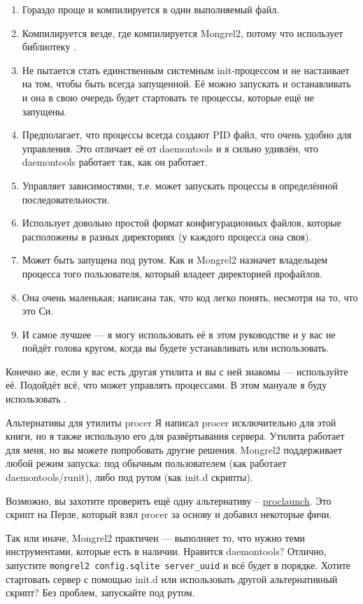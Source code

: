 \begin{enumerate}
\item Гораздо проще и компилируется в один выполняемый файл.
\item Компилируется везде, где компилируется Mongrel2, потому что использует
    библиотеку .
\item Не пытается стать единственным системным init-процессом и не настаивает на
    том, чтобы быть всегда запущенной. Её можно запускать и останавливать и она в
    свою очередь будет стартовать те процессы, которые ещё не запущены.
\item Предполагает, что процессы всегда создают PID файл, что очень удобно
    для управления. Это отличает её от daemontools и я сильно удивлён, что
    daemontools работает так, как он работает.
\item Управляет зависимостями, т.е. может запускать процессы в определённой
    последовательности.
\item Использует довольно простой формат конфигурационных файлов, которые
    расположены в разных директориях (у каждого процесса она своя).
\item Может быть запущена под рутом. Как и Mongrel2 назначет владельцем процесса
    того пользователя, который владеет директорией профайлов.
\item Она очень маленькая; написана так, что код легко понять, несмотря на то,
    что это Си.
\item И самое лучшее --- я могу использовать её в этом руководстве и у вас не
    пойдёт голова кругом, когда вы будете устанавливать или использовать.
\end{enumerate}

Конечно же, если у вас есть другая утилита и вы с ней знакомы --- используйте
её. Подойдёт всё, что может управлять процессами. В этом мануале я буду
использовать .

\begin{aside}{Альтернативы для утилиты procer}
Я написал procer исключительно для этой книги, но я также использую его для
развёртывания сервера. Утилита работает для меня, но вы можете попробовать
другие решения. Mongrel2 поддерживает любой режим запуска: под обычным
пользователем (как работает daemontools/runit), либо под рутом (как init.d
скрипты). 

Возможно, вы захотите проверить ещё одну альтернативу --
\href{http://github.com/peterkeen/proclaunch}{proclaunch}. Это скрипт на Перле,
который взял procer за основу и добавил некоторые фичи.

Так или иначе, Mongrel2 практичен --- выполняет то, что нужно теми инструментами,
которые есть в наличии. Нравится daemontools? Отлично, запустите \verb|mongrel2 config.sqlite server_uuid|
и всё будет в порядке. Хотите стартовать сервер с
помощью init.d или использовать другой альтернативный скрипт? Без проблем,
запускайте под рутом.
\end{aside}


